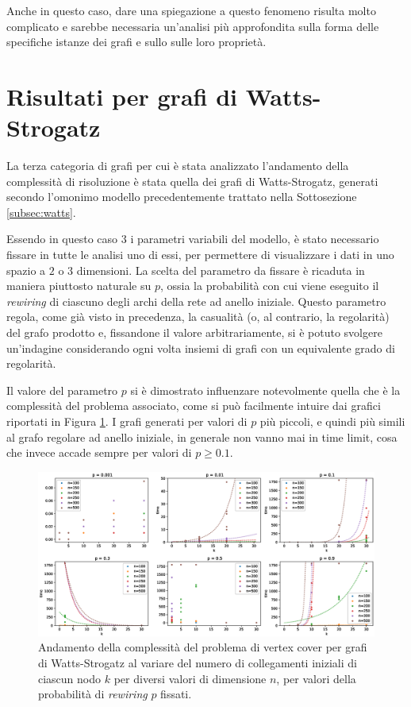 Anche in questo caso, dare una spiegazione a questo fenomeno risulta molto complicato e sarebbe necessaria un'analisi più approfondita sulla forma delle specifiche istanze dei grafi e sullo sulle loro proprietà.

\newpage
\section{Risultati per grafi di Watts-Strogatz}
La terza categoria di grafi per cui è stata analizzato l'andamento della complessità di risoluzione è stata quella dei grafi di Watts-Strogatz, generati secondo l'omonimo modello precedentemente trattato nella Sottosezione \ref{subsec:watts}.

Essendo in questo caso $3$ i parametri variabili del modello, è stato necessario fissare in tutte le analisi uno di essi, per permettere di visualizzare i dati in uno spazio a $2$ o $3$ dimensioni. La scelta del parametro da fissare è ricaduta in maniera piuttosto naturale su $p$, ossia la probabilità con cui viene eseguito il \textit{rewiring} di ciascuno degli archi della rete ad anello iniziale. Questo parametro regola, come già visto in precedenza, la casualità (o, al contrario, la regolarità) del grafo prodotto e, fissandone il valore arbitrariamente, si è potuto svolgere un'indagine considerando ogni volta insiemi di grafi con un equivalente grado di regolarità. 

Il valore del parametro $p$ si è dimostrato influenzare notevolmente quella che è la complessità del problema associato, come si può facilmente intuire dai grafici riportati in Figura \ref{fig:wsgp}. I grafi generati per valori di $p$ più piccoli, e quindi più simili al grafo regolare ad anello iniziale, in generale non vanno mai in time limit, cosa che invece accade sempre per valori di $p \geq 0.1$.

\begin{figure}[h!]
     \centering
       \includegraphics[scale=0.42]{images/wsgp.eps}
       \vspace{-0.3cm}
       \caption{Andamento della complessità del problema di vertex cover per grafi di Watts-Strogatz al variare del numero di collegamenti iniziali di ciascun nodo $k$ per diversi valori di dimensione $n$, per valori della probabilità di \textit{rewiring} $p$ fissati.}
        \label{fig:wsgp}
\end{figure}

